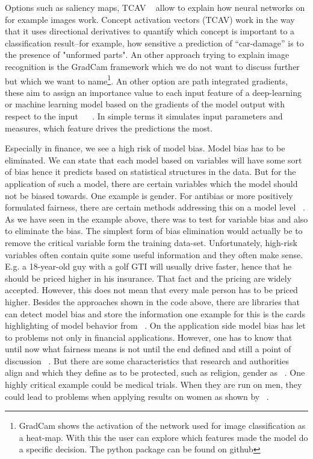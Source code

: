 \documentclass[jou,apacite]{apa6}
\begin{document}
Options such as saliency maps, TCAV ~\cite{kim2018interpretability} allow to explain how neural networks on for example images work. Concept activation vectors (TCAV) work in the way that it uses directional derivatives to quantify which concept is important to a classification result–for example, how sensitive a prediction of “car-damage” is to the presence of "unformed parts". An other approach trying to explain image recognition is the GradCam framework which we do not want to discuss further but which we want to name\footnote{GradCam shows the activation of the network used for image classification as a heat-map. With this the user can explore which features made the model do a specific decision. The python package can be found on github}. 
An other option are path integrated gradients, these aim to assign an importance value to each input feature of a deep-learning or machine learning model based on the gradients of the model output with respect to the input ~\cite{kaushik2018did} ~\cite{sundararajan2017axiomatic}. In simple terms it simulates input parameters and measures, which feature drives the predictions the most.\par

Especially in finance, we see a high risk of model bias. Model bias has to be eliminated. We can state that each model based on variables will have some sort of bias hence it predicts based on statistical structures in the data. But for the application of such a model, there are certain variables which the model should not be biased towards. One example is gender. For antibias or more positively formulated fairness, there are certain methods addressing this on a model level ~\cite{du2020fairness}. As we have seen in the example above, there was to test for variable bias and also to eliminate the bias. The simplest form of bias elimination would actually be to remove the critical variable form the training data-set. Unfortunately, high-risk variables often contain quite some useful information and they often make sense. E.g. a 18-year-old guy with a golf GTI will usually drive faster, hence that he should be priced higher in his insurance. That fact and the pricing are widely accepted. However, this does not mean that every male person has to be priced higher. Besides the approaches shown in the code above, there are libraries that can detect model bias and store the information one example for this is the cards highlighting of model behavior from ~\cite{mitchell2019model}. On the application side model bias has let to problems not only in financial applications. However, one has to know that until now what fairness means is not until the end defined and still a point of discussion ~\cite{verma2018fairness}. But there are some characteristics that research and authorities align and which they define as to be protected, such as religion, gender as ~\cite{corbett2018measure}. One highly critical example could be medical trials. When they are run on men, they could lead to problems when applying results on women as shown by ~\cite{westervelt2015medical}. \par
\end{document}

